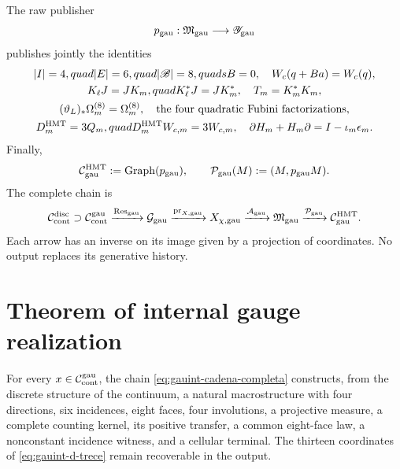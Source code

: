 The raw publisher
\begin{equation}\label{eq:gauint-publicador-crudo}
 p_{\rm gau}:\mathfrak M_{\rm gau}\longrightarrow
 \mathscr Y_{\rm gau}
\end{equation}
publishes jointly the identities
\[
 \begin{gathered}
 |I|=4,quad |E|=6,quad |\mathscr B|=8,quad sB=0,
 \quad W_c(q+Ba)=W_c(q),\\
 K_\ell J=JK_m,quad K_\ell^*J=JK_m^*,
 \quad T_m=K_m^*K_m,\\
 (\vartheta_L)_*\Omega_m^{(8)}=\Omega_m^{(8)},
 \quad \text{the four quadratic Fubini factorizations},\\
 D_m^{\rm HMT}=3Q_m,quad D_m^{\rm HMT}W_{c,m}=3W_{c,m},
 \quad \partial H_m+H_m\partial=I-\iota_m\epsilon_m.
 \end{gathered}
\]
Finally,
\begin{equation}\label{eq:gauint-graph-p}
 \mathcal C_{\rm gau}^{\rm HMT}:=\operatorname{Graph}(p_{\rm gau}),
 \qquad
 \mathcal P_{\rm gau}(M):=(M,p_{\rm gau}M).
\end{equation}
The complete chain is
\begin{equation}\label{eq:gauint-cadena-completa}
 \mathcal C_{\rm cont}^{\rm disc}\supset
 \mathcal C_{\rm cont}^{\rm gau}
 \xrightarrow{\operatorname{Res}_{\rm gau}}\mathcal G_{\rm gau}
 \xrightarrow{\operatorname{pr}_{X,{\rm gau}}}X_{\chi,{\rm gau}}
 \xrightarrow{\mathcal A_{\rm gau}}\mathfrak M_{\rm gau}
 \xrightarrow{\mathcal P_{\rm gau}}\mathcal C_{\rm gau}^{\rm HMT}.
\end{equation}
Each arrow has an inverse on its image given by a projection of
coordinates. No output replaces its generative history.

\section{Theorem of internal gauge realization}

\begin{theorem}
\label{thm:gauint-realizacion}
For every \(x\in\mathcal C_{\rm cont}^{\rm gau}\), the chain \eqref{eq:gauint-cadena-completa} constructs, from the discrete structure of the continuum, a natural macrostructure with four directions, six incidences, eight faces, four involutions, a projective measure, a complete counting kernel, its positive transfer, a common eight-face law, a nonconstant incidence witness, and a cellular terminal. The thirteen coordinates of \eqref{eq:gauint-d-trece} remain recoverable in the output.
\end{theorem}

